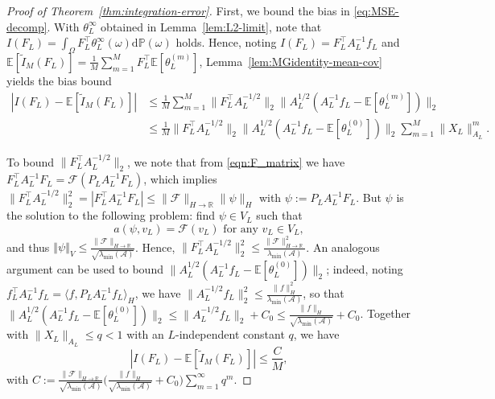 \documentclass[11pt,english]{article}
\theoremstyle{plain}
\theoremstyle{plain}
\theoremstyle{plain}
\theoremstyle{plain}
\numberwithin{equation}{section}
\begin{document}
\begin{proof}[Proof of Theorem~\ref{thm:integration-error}]
	First, we bound the bias in \eqref{eq:MSE-decomp}. With $\theta_{L}^{\infty}$
	obtained in Lemma~\ref{lem:L2-limit}, note that $I(F_{L})=\int_{\Omega}F_{L}^{\top}\theta_{L}^{\infty}(\omega)\mathrm{d}\mathbb{P}(\omega)$
	holds. Hence, noting $I(F_{L})=F_{L}^{\top}A_{L}^{-1}f_{L}$ and
	$\mathbb{E}[\tilde{I}_{M}(F_{L})]=\frac{1}{M}\sum_{m=1}^{M}F_{L}^{\top}\mathbb{E}[\theta_{L}^{(m)}]$,
	Lemma~\ref{lem:MGidentity-mean-cov} yields the bias bound
	\begin{align*}
		|I(F_{L})-\mathbb{E}[\tilde{I}_{M}(F_{L})]| & \leq\frac{1}{M}\sum_{m=1}^{M}\|F_{L}^{\top}A_{L}^{-1/2}\|_{2}\|A_{L}^{1/2}(A_{L}^{-1}f_{L}-\mathbb{E}[\theta_{L}^{(m)}])\|_{2}                       \\
		                                            & \leq\frac{1}{M}\|F_{L}^{\top}A_{L}^{-1/2}\|_{2}\|A_{L}^{1/2}(A_{L}^{-1}f_{L}-\mathbb{E}[\theta_{L}^{(0)}])\|_{2}\sum_{m=1}^{M}\|X_{L}\|_{A_{L}}^{m}.
	\end{align*}

	To bound $\|F_{L}^{\top}A_{L}^{-1/2}\|_{2}$, we note that from \eqref{eqn:F_matrix}
	we have $F_{L}^{\top}A_{L}^{-1}F_{L}=\mathcal{F}(P_{L}A_{L}^{-1}F_{L})$, which implies $\|F_{L}^{\top}A_{L}^{-1/2}\|_{2}^{2}=|F_{L}^{\top}A_{L}^{-1}F_{L}|\leq\|\mathcal{F}\|_{H\to\mathbb{R}}\|\psi\|_{H}$
	with $\psi:=P_{L}A_{L}^{-1}F_{L}$. But $\psi$ is the solution to
	the following problem: find $\psi\in V_{L}$ such that
	\[
		a(\psi,v_{L})=\mathcal{F}(v_{L})\text{ for any }v_{L}\in V_{L},
	\]
	and thus $\left\Vert \psi\right\Vert _{V}\leq\frac{\|\mathcal{F}\|_{H\rightarrow\mathbb{R}}}{\sqrt{\lambda_{\min}(\mathcal{A})}}$.
	Hence, $\|F_{L}^{\top}A_{L}^{-1/2}\|_{2}^{2}\leq\frac{\|\mathcal{F}\|_{H\rightarrow\mathbb{R}}^{2}}{\lambda_{\min}(\mathcal{A})}$.
	An analogous argument can be used to bound $\|A_{L}^{1/2}(A_{L}^{-1}f_{L}-\mathbb{E}[\theta_{L}^{(0)}])\|_{2}$;
	indeed, noting $f_{L}^{\top}A_{L}^{-1}f_{L}=\langle f,P_{L}A_{L}^{-1}f_{L}\rangle_{H}$,
	we have $\|A_{L}^{-1/2}f_{L}\|_{2}^{2}\leq\frac{\|f\|_{H}^{2}}{\lambda_{\min}(\mathcal{A})}$,
	so that
	$
		\|A_{L}^{1/2}(A_{L}^{-1}f_{L}-\mathbb{E}[\theta_{L}^{(0)}])\|_{2}\leq\|A_{L}^{-1/2}f_{L}\|_{2}+C_{0}\leq\frac{\|f\|_{H}}{\sqrt{\lambda_{\min}(\mathcal{A})}}+C_{0}
	$.
	Together with $\|X_{L}\|_{A_{L}}\leq q<1$ with an $L$-independent
	constant $q$, we have
	\[
		|I(F_{L})-\mathbb{E}[\tilde{I}_{M}(F_{L})]|\leq\frac{C}{M},
	\]
	with $C:=\frac{\|\mathcal{F}\|_{H\rightarrow\mathbb{R}}}{\sqrt{\lambda_{\min}(\mathcal{A})}}\bigg(\frac{\|f\|_{H}}{\sqrt{\lambda_{\min}(\mathcal{A})}}+C_{0}\bigg)\sum_{m=1}^{\infty}q^{m}$.


\end{proof}
\end{document}
